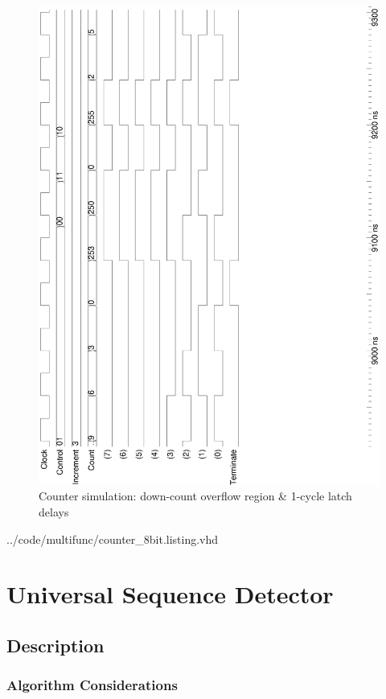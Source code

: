 \documentclass[10pt,a4paper]{report}
\begin{document}
\begin{figure}
\center
\includegraphics[scale=0.49,angle=-90]{graphs/counter_8bit_test2.ps}
\caption{\small{Counter simulation: down-count overflow region \& 1-cycle latch delays}} \label{wave:c8:w2}
\end{figure}

\pagebreak

{../code/multifunc/counter_8bit.listing.vhd}

\pagebreak
\section{Universal Sequence Detector}
\subsection{Description}

\subsubsection{Algorithm Considerations}
\end{document}

